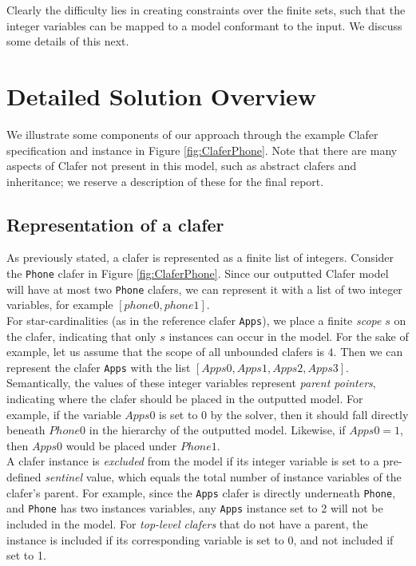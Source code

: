 \documentclass{article}
\begin{document}
Clearly the difficulty lies in creating constraints over the finite sets, such that the integer variables can be mapped to a model conformant to the input. We discuss some details of this next.

\section{Detailed Solution Overview}
We illustrate some components of our approach through the example Clafer specification and instance in Figure \ref{fig:ClaferPhone}. Note that there are many aspects of Clafer not present in this model, such as abstract clafers and inheritance; we reserve a description of these for the final report.
\subsection{Representation of a clafer}
As previously stated, a clafer is represented as a finite list of integers. Consider the \texttt{Phone} clafer in Figure \ref{fig:ClaferPhone}. Since our outputted Clafer model will have at most two \texttt{Phone} clafers, we can represent it with a list of two integer variables, for example $[phone0, phone1]$.  \\
\indent For star-cardinalities (as in the reference clafer \texttt{Apps}), we place a finite \textit{scope} $s$ on the clafer, indicating that only $s$ instances can occur in the model. For the sake of example, let us assume that the scope of all unbounded clafers is $4$. Then we can represent the clafer \texttt{Apps} with the list $[Apps0, Apps1, Apps2, Apps3]$.\\
\indent Semantically, the values of these integer variables represent \textit{parent pointers}, indicating where the clafer should be placed in the outputted model. For example, if the variable $Apps0$ is set to $0$ by the solver, then it should fall directly beneath $Phone0$ in the hierarchy of the outputted model. Likewise, if $Apps0 = 1$, then $Apps0$ would be placed under $Phone1$.\\
\indent A clafer instance is \textit{excluded} from the model if its integer variable is set to a pre-defined \textit{sentinel} value, which equals the total number of instance variables of the clafer's parent. For example, since the \texttt{Apps} clafer is directly underneath \texttt{Phone}, and \texttt{Phone} has two instances variables, any \texttt{Apps} instance set to 2 will not be included in the model. For \textit{top-level clafers} that do not have a parent, the instance is included if its corresponding variable is set to 0, and not included if set to 1.
\end{document}
